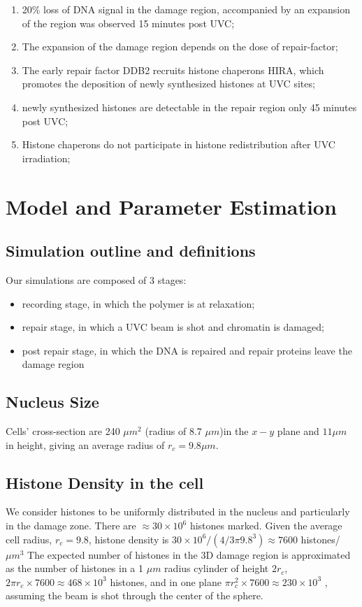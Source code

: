 \documentclass[12pt]{report}
\begin{document}
\begin{enumerate}
		\item 20\% loss of DNA signal in the damage region, accompanied by an expansion of the region was observed 15 minutes post UVC;
		\item The expansion of the damage region depends on the dose of repair-factor;		
		\item The early repair factor DDB2 recruits histone chaperons HIRA, which promotes the deposition of newly synthesized histones at UVC sites;
		\item newly synthesized histones are detectable in the repair region only 45 minutes post UVC;
		\item Histone chaperons do not participate in histone redistribution after UVC irradiation;
		
	\end{enumerate}
	
	
	\section{Model and Parameter Estimation}\label{section:ModelAndParameterEstimation}

	\subsection{Simulation outline and definitions}\label{subsection:simulationOutlineAndDefinitions}
	Our simulations are composed of 3 stages: 
	\begin{itemize}
		\itemsep0em
		\item recording stage, in which the polymer is at relaxation;
		\item repair stage, in which a UVC beam is shot and chromatin is damaged;
		\item post repair stage, in which the DNA is repaired and repair proteins leave the damage region
    \end{itemize}
    
	\subsection{Nucleus Size}
	 Cells' cross-section are 240 $\mu m^2$ (radius of 8.7 $\mu m$)in the $x-y$ plane and $11 \mu m$ in height, giving an average radius of $r_c = 9.8 \mu m$.
	\subsection{Histone Density in the cell}\label{subsection:HistoneDensity}
      We consider histones to be uniformly distributed in the nucleus and particularly in the damage zone. There are $\approx30\times 10^6$ histones marked. Given the average cell radius, $r_c=9.8$, histone density is $30\times 10^6 /(4/3 \pi 9.8^3)\approx 7600$ histones/$\mu m^3$
	  The expected number of histones in the 3D damage region is approximated as the number of histones in a 1 $\mu m$ radius cylinder of height $2r_c$, $2\pi r_c \times 7600\approx 468\times 10^3$ histones, and in one plane $\pi r_c^2 \times 7600 \approx 230 \times 10^3$ , assuming the beam is shot through the center of the sphere. 			
	   	
\end{document}
